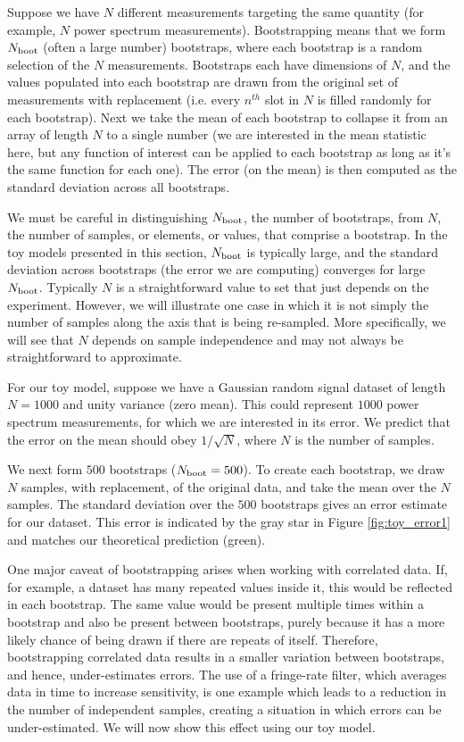 \documentclass[preprint2,numberedappendix,tighten]{aastex6}
\begin{document}
Suppose we have $N$ different measurements targeting the same quantity (for example, $N$ power spectrum measurements). 
Bootstrapping means that we form $N_{\rm boot}$ (often a large number) bootstraps, where each bootstrap is a random selection 
of the $N$ measurements. Bootstraps each have dimensions of $N$, and the values populated into each bootstrap are drawn 
from the original set of measurements with replacement (i.e. every $n^{th}$ slot in $N$ is filled randomly for each bootstrap). Next we take 
the mean of each bootstrap to collapse it from an array of length $N$ to a single number (we are interested in the mean statistic 
here, but any function of interest can be applied to each bootstrap as long as it's the same function for each one). The error (on 
the mean) is then computed as the standard deviation across all bootstraps. 

We must be careful in distinguishing $N_{\rm boot}$, the number of bootstraps, from $N$, the number of samples, or elements, or 
values, that comprise a bootstrap. In the toy models presented in this section, $N_{\rm boot}$ is typically large, and the standard 
deviation across bootstraps (the error we are computing) converges for large $N_{\rm boot}$. Typically $N$ is a straightforward value to set that just depends on the experiment. However, we will illustrate one case in which it is not simply the number of samples along the axis that is being re-sampled. More specifically, we will see that $N$ depends on sample independence and may not always be straightforward to approximate. 

For our toy model, suppose we have a Gaussian random signal dataset of length $N=1000$ and unity variance (zero mean). 
This could represent $1000$ power spectrum measurements, for which we are interested in its error. We predict that the error 
on the mean should obey $1/\sqrt{N}$, where $N$ is the number of samples.

We next form $500$ bootstraps ($N_{\rm boot} = 500$). To create each bootstrap, we draw $N$ samples, with replacement, of the 
original data, and take the mean over the $N$ samples. The standard deviation over the $500$ bootstraps gives an error 
estimate for our dataset. This error is indicated by the gray star in Figure \ref{fig:toy_error1} and matches our theoretical 
prediction (green).

One major caveat of bootstrapping arises when working with correlated data. If, for example, a dataset has many repeated 
values inside it, this would be reflected in each bootstrap. The same value would be present multiple times within a bootstrap 
and also be present between bootstraps, purely because it has a more likely chance of being drawn if there are repeats of 
itself. Therefore, bootstrapping correlated data results in a smaller variation between bootstraps, and hence, under-estimates 
errors. The use of a fringe-rate filter, which averages data in time to increase sensitivity, is one example which leads to a 
reduction in the number of independent samples, creating a situation in which errors can be under-estimated. We will now show 
this effect using our toy model.
\end{document}
